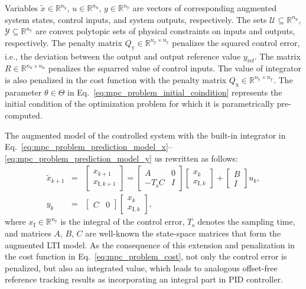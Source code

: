 \documentclass[preprint,12pt]{elsarticle}
\begin{document}
	Variables $\widetilde{x} \in \mathbb{R}^{n_{\widetilde{\mathrm{x}}}}$, $u \in \mathbb{R}^{n_{\mathrm{u}}}$, $y \in \mathbb{R}^{n_{\mathrm{y}}}$ are vectors of corresponding augmented system states, control inputs, and system outputs, respectively. 
	The sets $\mathcal{U} \subseteq \mathbb{R}^{n_{\mathrm{u}}}$, $\mathcal{Y} \subseteq \mathbb{R}^{n_{\mathrm{y}}}$ are convex polytopic sets of physical constraints on inputs and outputs, respectively. The penalty matrix $Q_\mathrm{y} \in \mathbb{R}^{n_{\mathrm{y}} \times n_{\mathrm{y}}}$ penalizes the squared control error, i.e., the deviation between the output and output reference value $y_\mathrm{ref}$. The matrix $R \in \mathbb{R}^{n_{\mathrm{u}} \times n_{\mathrm{u}}}$ penalizes the squarred value of control inputs. 
	The value of integrator is also penalized in the cost function with the penalty matrix $Q_\mathrm{x} \in \mathbb{R}^{n_{\mathrm{y}} \times n_{\mathrm{y}}}$. 
	The parameter $\theta \in \Theta$ in Eq.~\eqref{eq:mpc_problem_initial_coindition} represents the initial condition of the optimization problem for which it is parametrically pre-computed. 
	
	The augmented model of the controlled system with the built-in integrator in Eq.~\eqref{eq:mpc_problem_prediction_model_x}--\eqref{eq:mpc_problem_prediction_model_y} us rewritten as follows:
	\begin{subequations}
		\begin{eqnarray} 
			\label{eq:mpc_augmented_model_x} 
			\widetilde{x}_{k+1} &=& \begin{bmatrix} x_{k+1} \\ x_{\mathrm{I},k+1}\end{bmatrix} = \begin{bmatrix} A & \textit{0} \\ -T_\mathrm{s} C & I \end{bmatrix} \begin{bmatrix} x_{k} \\ x_{\mathrm{I},k} \end{bmatrix} + \begin{bmatrix} B \\ I \end{bmatrix} u_{k}, \\
			\label{eq:mpc_augmented_model_y}
			y_k &=& \begin{bmatrix} C & \textit{0} \end{bmatrix} \begin{bmatrix} x_{k} \\ x_{\mathrm{I},k} \end{bmatrix},
		\end{eqnarray}
	\end{subequations}
	where $x_{\mathrm{I}} \in \mathbb{R}^{n_{\mathrm{y}}}$ is the integral of the control error, $T_\mathrm{s}$ denotes the sampling time, and matrices $A$, $B$, $C$ are well-known the state-space matrices that form the augmented LTI model. As the consequence of this extension and penalization in the cost function in Eq.~\eqref{eq:mpc_problem_cost}, not only the control error is penalized, but also an integrated value, which leads to analogous offset-free reference tracking results as incorporating an integral part in PID controller.
	
\end{document}
